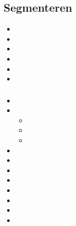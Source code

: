 \subsection{Segmenteren}

\begin{itemize}
\item 
\item 
\item 
\item 
\item 
\item 
\end{itemize}

\subsubsection{}

\begin{itemize}
    \item 
    \item 
        \begin{itemize}
        \item 
        \item 
        \item 
        \end{itemize}
    \item 
    \item 
    \item 
    \item 
    \item 
    \item 
    \item 
    \item 
\end{itemize}

\subsubsection{}

\subsubsection{}

\subsubsection{}

\subsubsection{}

\subsubsection{}

\subsubsection{}

\subsubsubsection{}

\subsubsubsection{}

\subsubsubsection{}

\subsubsubsection{}

\subsubsubsection{}

\subsubsubsection{}